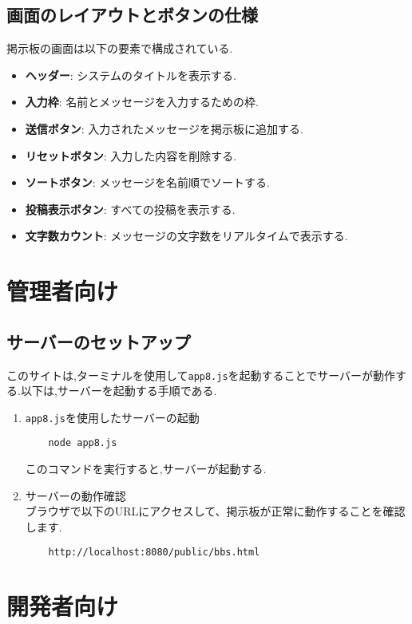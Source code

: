 \documentclass[uplatex,dvipdfmx]{jsarticle}
\begin{document}
\subsection{画面のレイアウトとボタンの仕様}
掲示板の画面は以下の要素で構成されている.
\begin{itemize}
    \item \textbf{ヘッダー}: システムのタイトルを表示する.
    \item \textbf{入力枠}: 名前とメッセージを入力するための枠.
    \item \textbf{送信ボタン}: 入力されたメッセージを掲示板に追加する.
    \item \textbf{リセットボタン}: 入力した内容を削除する.
    \item \textbf{ソートボタン}: メッセージを名前順でソートする.
    \item \textbf{投稿表示ボタン}: すべての投稿を表示する.
    \item \textbf{文字数カウント}: メッセージの文字数をリアルタイムで表示する.
\end{itemize}

\section{管理者向け}
\subsection{サーバーのセットアップ}
このサイトは,ターミナルを使用して\texttt{app8.js}を起動することでサーバーが動作する.以下は,サーバーを起動する手順である.
\begin{enumerate}
    \item \texttt{app8.js}を使用したサーバーの起動
    \begin{verbatim}
    node app8.js
    \end{verbatim}
    このコマンドを実行すると,サーバーが起動する.

    \item サーバーの動作確認
    \\ ブラウザで以下のURLにアクセスして、掲示板が正常に動作することを確認します.
    \begin{verbatim}
    http://localhost:8080/public/bbs.html
    \end{verbatim}
\end{enumerate}

\section{開発者向け}
\end{document}
